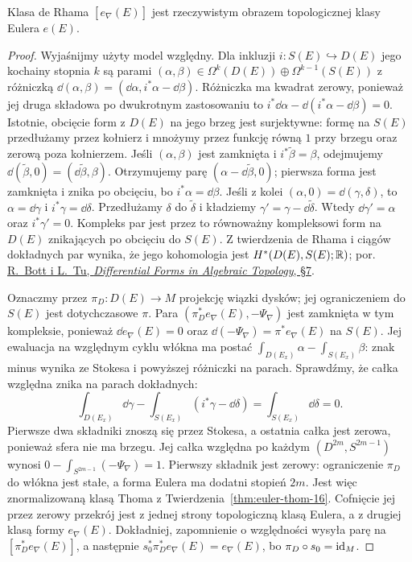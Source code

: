 \begin{stwierdzenie}
\label{prop:euler-identification-26}
Klasa de Rhama $[e_\nabla(E)]$
jest rzeczywistym obrazem
topologicznej klasy Eulera $e(E)$.
\end{stwierdzenie}
\begin{proof}
Wyjaśnijmy użyty model względny. Dla inkluzji
$i:S(E)\hookrightarrow D(E)$ jego kochainy
stopnia $k$ są parami
$(\alpha,\beta)\in\Omega^k(D(E))\oplus
\Omega^{k-1}(S(E))$ z różniczką
$\dd(\alpha,\beta)=(\dd\alpha,i^*\alpha-\dd\beta)$.
Różniczka ma kwadrat zerowy, ponieważ jej druga składowa
po dwukrotnym zastosowaniu to
$i^*\dd\alpha-\dd(i^*\alpha-\dd\beta)=0$.
Istotnie, obcięcie form z $D(E)$ na jego brzeg
jest surjektywne: formę na $S(E)$ przedłużamy
przez kołnierz i mnożymy przez funkcję równą $1$ przy brzegu
oraz zerową poza kołnierzem.
Jeśli $(\alpha,\beta)$ jest zamknięta i
$i^*\widetilde\beta=\beta$, odejmujemy
$\dd(\widetilde\beta,0)=(\dd\widetilde\beta,\beta)$.
Otrzymujemy parę $(\alpha-\dd\widetilde\beta,0)$;
pierwsza forma jest zamknięta i znika po obcięciu,
bo $i^*\alpha=\dd\beta$.
Jeśli z kolei $(\alpha,0)=\dd(\gamma,\delta)$, to
$\alpha=\dd\gamma$ i $i^*\gamma=\dd\delta$.
Przedłużamy $\delta$ do $\widetilde\delta$ i kładziemy
$\gamma'=\gamma-\dd\widetilde\delta$.
Wtedy $\dd\gamma'=\alpha$ oraz $i^*\gamma'=0$.
Kompleks par jest przez to równoważny kompleksowi
form na $D(E)$ znikających po obcięciu do $S(E)$.
Z twierdzenia de Rhama i ciągów dokładnych par
wynika, że jego kohomologia jest
$H^*(D(E),S(E);\mathbb{R})$; por.
\href{https://doi.org/10.1007/978-1-4757-3951-0}
{R.\ Bott i L.\ Tu, \emph{Differential Forms in Algebraic Topology},
§7}.

Oznaczmy przez $\pi_D:D(E)\to M$ projekcję wiązki dysków;
jej ograniczeniem do $S(E)$ jest dotychczasowe $\pi$.
Para $(\pi_D^*e_\nabla(E),-\Psi_\nabla)$
jest zamknięta w tym kompleksie, ponieważ
$\dd e_\nabla(E)=0$ oraz
$\dd(-\Psi_\nabla)=\pi^*e_\nabla(E)$ na $S(E)$.
Jej ewaluacja na względnym cyklu włókna
ma postać $\int_{D(E_x)}\alpha-\int_{S(E_x)}\beta$:
znak minus wynika ze Stokesa i powyższej
różniczki na parach.
Sprawdźmy, że całka względna znika na parach dokładnych:
\[
 \int_{D(E_x)}\dd\gamma
 -\int_{S(E_x)}(i^*\gamma-\dd\delta)
 =\int_{S(E_x)}\dd\delta=0.
\]
Pierwsze dwa składniki znoszą się przez Stokesa,
a ostatnia całka jest zerowa, ponieważ sfera nie ma brzegu.
Jej całka względna po każdym
$(D^{2m},S^{2m-1})$ wynosi
$0-\int_{S^{2m-1}}(-\Psi_\nabla)=1$.
Pierwszy składnik jest zerowy: ograniczenie $\pi_D$
do włókna jest stałe, a forma Eulera ma dodatni stopień $2m$.
Jest więc znormalizowaną klasą
Thoma z Twierdzenia~\ref{thm:euler-thom-16}.
Cofnięcie jej przez zerowy przekrój
jest z jednej strony topologiczną
klasą Eulera, a z drugiej klasą
formy $e_\nabla(E)$.
Dokładniej, zapomnienie o względności wysyła parę na
$[\pi_D^*e_\nabla(E)]$, a następnie
$s_0^*\pi_D^*e_\nabla(E)=e_\nabla(E)$,
bo $\pi_D\circ s_0=\mathrm{id}_M$.
\end{proof}


